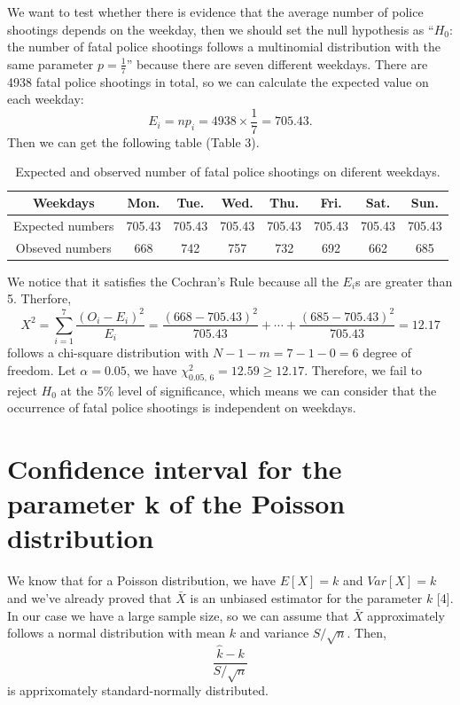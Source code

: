 \documentclass[a4paper]{article}
\begin{document}
We want to test whether there is evidence that the average number of police shootings depends on the weekday, then we should set the null hypothesis as “$H_0$: the number of fatal police shootings follows a multinomial distribution with the same parameter $p=\frac{1}{7}$” because there are seven different weekdays. There are 4938 fatal police shootings in total, so we can calculate the expected value on each weekday:
$$E_i=np_i=4938\times\frac{1}{7}=705.43.$$
Then we can get the following table (Table 3).
\begin{table}[H]
\centering
\begin{spacing}{1.10}
\begin{tabular}{|c|c|c|c|c|c|c|c|}
\hline
Weekdays         & Mon.   & Tue.   & Wed.   & Thu.  & Fri.   & Sat.   & Sun.   \\ \hline
Expected numbers & 705.43 & 705.43 & 705.43 & 705.43 & 705.43 & 705.43 & 705.43 \\ \hline
Obseved numbers  & 668    & 742    & 757    & 732    & 692    & 662    & 685    \\ \hline
\end{tabular}
\end{spacing}
\caption{Expected and observed number of fatal police shootings on diferent weekdays.}
\end{table}

We notice that it satisfies the Cochran's Rule because all the $E_i$s are greater than 5. Therfore,
$$X^2=\sum_{i=1}^7\frac{(O_i-E_i)^2}{E_i}=\frac{(668-705.43)^2}{705.43}+\cdots+\frac{(685-705.43)^2}{705.43}=12.17$$ follows a chi-square distribution with $N-1-m=7-1-0=6$ degree of freedom. Let $\alpha=0.05$, we have $\chi_{0.05,\,6}^2=12.59\ge12.17$. Therefore, we fail to reject $H_0$ at the 5\% level of significance, which means we can consider that the occurrence of fatal police shootings is independent on weekdays.

\section{Confidence interval for the parameter k of the Poisson distribution}

	We know that for a Poisson distribution, we have $E[X]=k$ and $Var[X]=k$ and we've already proved that $\bar{X}$ is an unbiased estimator for the parameter $k$ [4]. In our case we have a large sample size, so we can assume that $\bar{X}$ approximately follows a normal distribution with mean $k$ and variance $S/\sqrt{n}$. Then,
	$$\frac{\hat{k}-k}{S/\sqrt{n}}$$
is apprixomately standard-normally distributed.
\end{document}
